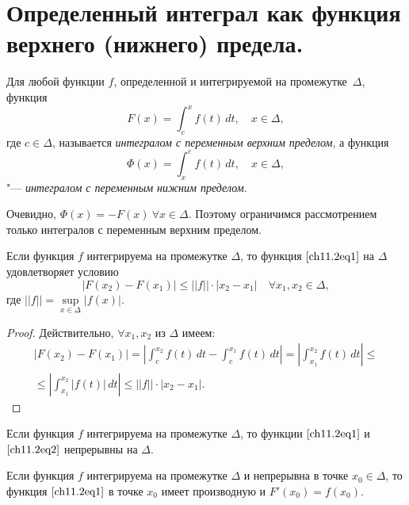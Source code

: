 \section{Определенный интеграл как функция верхнего (нижнего) предела.}

Для любой функции $f$, определенной и интегрируемой на промежутке~$\Delta$, функция
\begin{equation} \label{ch11.2eq1}
F(x) = \int_{c}^{x} f(t) \,dt, \quad x \in \Delta,
\end{equation}
где $c \in \Delta$, называется \textit{интегралом с переменным верхним пределом}, а функция
\begin{equation} \label{ch11.2eq2}
\Phi(x) = \int_{x}^{c} f(t) \,dt, \quad x \in \Delta,
\end{equation}
"--- \textit{интегралом с переменным нижним пределом}.

Очевидно, $\Phi(x) = -F(x)\ \forall x \in \Delta$. Поэтому ограничимся рассмотрением только интегралов с переменным верхним пределом.

\begin{thm}
Если функция $f$ интегрируема на промежутке $\Delta$, то функция $\eqref{ch11.2eq1}$ на $\Delta$ удовлетворяет условию
$$
|F(x_2) - F(x_1)| \le ||f|| \cdot |x_2 - x_1| \quad \forall x_1, x_2 \in \Delta,
$$
где $||f|| = \sup\limits_{x \in \Delta} |f(x)|$.
\end{thm}

\begin{proof}
Действительно, $\forall x_1, x_2$ из $\Delta$ имеем:
\begin{multline*}
|F(x_2) - F(x_1)| = \left| \int_{c}^{x_2}f(t) \,dt - \int_{c}^{x_1} f(t) \,dt\right| = \left| \int_{x_1}^{x_2}f(t) \,dt \right| \le\\ \le \left| \int_{x_1}^{x_2}|f(t)| \,dt \right| \le ||f|| \cdot |x_2 - x_1|.\tag*{\qedhere}
\end{multline*}
\end{proof}

\begin{cons}
Если функция $f$ интегрируема на промежутке $\Delta$, то функции $\eqref{ch11.2eq1}$ и $\eqref{ch11.2eq2}$ непрерывны на $\Delta$.
\end{cons}

\begin{thm}
Если функция $f$ интегрируема на промежутке $\Delta$ и непрерывна в точке $x_0 \in \Delta$, то функция $\eqref{ch11.2eq1}$ в точке $x_0$ имеет производную и $F'(x_0) = f(x_0)$.
\end{thm}

